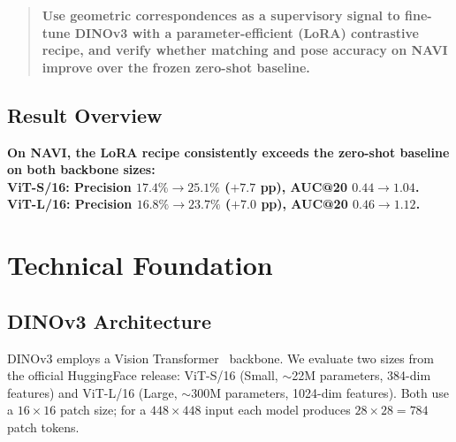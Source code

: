 \documentclass[11pt,a4paper]{article}
\begin{document}
\begin{quote}
\bfseries Use geometric correspondences as a supervisory signal to fine-tune DINOv3 with a
parameter-efficient (LoRA) contrastive recipe, and verify whether matching and pose accuracy on NAVI
improve over the frozen zero-shot baseline.
\end{quote}

\subsection{Result Overview}

\begin{center}
\color{green!55!black}\bfseries
On NAVI, the LoRA recipe consistently exceeds the zero-shot baseline on both backbone sizes:\\[2pt]
\normalsize
ViT-S/16: Precision $17.4\% \rightarrow 25.1\%$ ($+7.7$ pp), AUC@20 $0.44 \rightarrow 1.04$.\\
ViT-L/16: Precision $16.8\% \rightarrow 23.7\%$ ($+7.0$ pp), AUC@20 $0.46 \rightarrow 1.12$.
\end{center}

\section{Technical Foundation}

\subsection{DINOv3 Architecture}

DINOv3 employs a Vision Transformer~\cite{vit} backbone. We evaluate two sizes from the official
HuggingFace release: ViT-S/16 (Small, $\sim$22M parameters, 384-dim features) and ViT-L/16
(Large, $\sim$300M parameters, 1024-dim features). Both use a $16\!\times\!16$ patch size; for a
$448\!\times\!448$ input each model produces $28\!\times\!28 = 784$ patch tokens.
\end{document}
